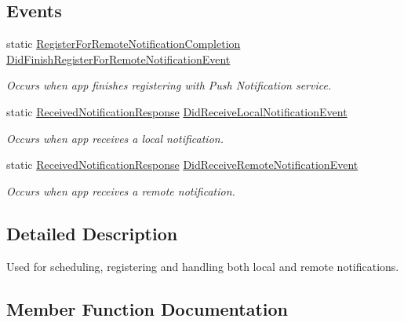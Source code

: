 \subsection*{Events}
\begin{DoxyCompactItemize}
\item 
static \hyperlink{class_voxel_busters_1_1_native_plugins_1_1_notification_service_ae68c46f5013c239b682e24ec68638aa6}{Register\+For\+Remote\+Notification\+Completion} \hyperlink{class_voxel_busters_1_1_native_plugins_1_1_notification_service_a6c46acbf61e90252864bf46037c8a42b}{Did\+Finish\+Register\+For\+Remote\+Notification\+Event}
\begin{DoxyCompactList}\small\item\em Occurs when app finishes registering with Push Notification service. \end{DoxyCompactList}\item 
static \hyperlink{class_voxel_busters_1_1_native_plugins_1_1_notification_service_abbbb745d69a5113b081d85f4b4660890}{Received\+Notification\+Response} \hyperlink{class_voxel_busters_1_1_native_plugins_1_1_notification_service_a7c1e2f29f0d6ce01cbda2a7b46bec757}{Did\+Receive\+Local\+Notification\+Event}
\begin{DoxyCompactList}\small\item\em Occurs when app receives a local notification. \end{DoxyCompactList}\item 
static \hyperlink{class_voxel_busters_1_1_native_plugins_1_1_notification_service_abbbb745d69a5113b081d85f4b4660890}{Received\+Notification\+Response} \hyperlink{class_voxel_busters_1_1_native_plugins_1_1_notification_service_afe03cd020860a6733c2262133e082610}{Did\+Receive\+Remote\+Notification\+Event}
\begin{DoxyCompactList}\small\item\em Occurs when app receives a remote notification. \end{DoxyCompactList}\end{DoxyCompactItemize}


\subsection{Detailed Description}
Used for scheduling, registering and handling both local and remote notifications. 



\subsection{Member Function Documentation}
\hypertarget{class_voxel_busters_1_1_native_plugins_1_1_notification_service_a83e1d708241a024ce3994443c3d30d78}{}
